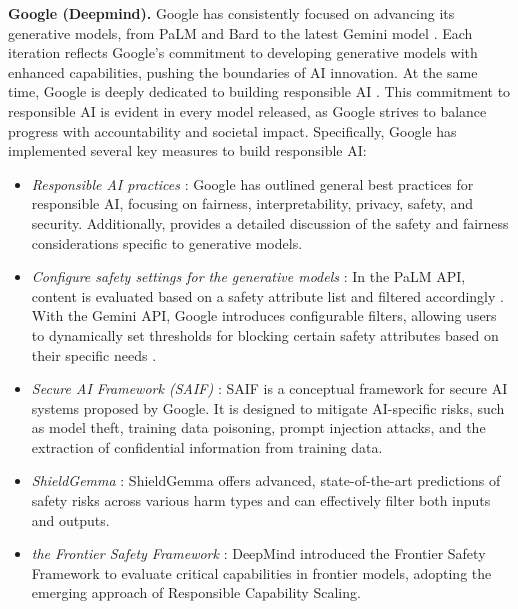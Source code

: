 \textbf{Google (Deepmind).} 
Google has consistently focused on advancing its generative models, from PaLM \cite{anil2023palm} and Bard \cite{bard} to the latest Gemini model \cite{team2023gemini}. Each iteration reflects Google's commitment to developing generative models with enhanced capabilities, pushing the boundaries of AI innovation. At the same time, Google is deeply dedicated to building responsible AI \cite{googleresponsibleAI, googleresearchresponsibleAI, googleresponsibleAIpractices}. This commitment to responsible AI is evident in every model released, as Google strives to balance progress with accountability and societal impact. Specifically, Google has implemented several key measures to build responsible AI: 
\begin{itemize}[nolistsep, leftmargin=15pt]
    \item[] \textcolor[HTML]{f1b504}{\largedot} {\textit{Responsible AI practices}} \cite{googleresponsibleAI, googleresearchresponsibleAI, googleresponsibleAIpractices}: Google has outlined general best practices for responsible AI, focusing on fairness, interpretability, privacy, safety, and security. Additionally, \cite{googleAISafetyGen} provides a detailed discussion of the safety and fairness considerations specific to generative models.
    \item[] \textcolor[HTML]{e23f32}{\largedot} {\textit{Configure safety settings for the generative models}} \cite{googlevertexAIsafety, googlevertexAImultimodalSafety}: In the PaLM API, content is evaluated based on a safety attribute list and filtered accordingly \cite{googlevertexAIsafety}. With the Gemini API, Google introduces configurable filters, allowing users to dynamically set thresholds for blocking certain safety attributes based on their specific needs \cite{googlevertexAImultimodalSafety}.
    \item[] \textcolor[HTML]{32a350}{\largedot} {\textit{Secure AI Framework (SAIF)}} \cite{googleAISaif}: SAIF is a conceptual framework for secure AI systems proposed by Google. It is designed to mitigate AI-specific risks, such as model theft, training data poisoning, prompt injection attacks, and the extraction of confidential information from training data.
    \item[] \textcolor[HTML]{4082ed}{\largedot} {\textit{ShieldGemma}} \cite{zeng2024shieldgemma}: ShieldGemma offers advanced, state-of-the-art predictions of safety risks across various harm types and can effectively filter both inputs and outputs.
    \item[] \textcolor[HTML]{e6e5e1}{\largedot} {\textit{the Frontier Safety Framework}} \cite{deepmindFrontierSafety}: DeepMind introduced the Frontier Safety Framework to evaluate critical capabilities in frontier models, adopting the emerging approach of Responsible Capability Scaling.

\end{itemize}
